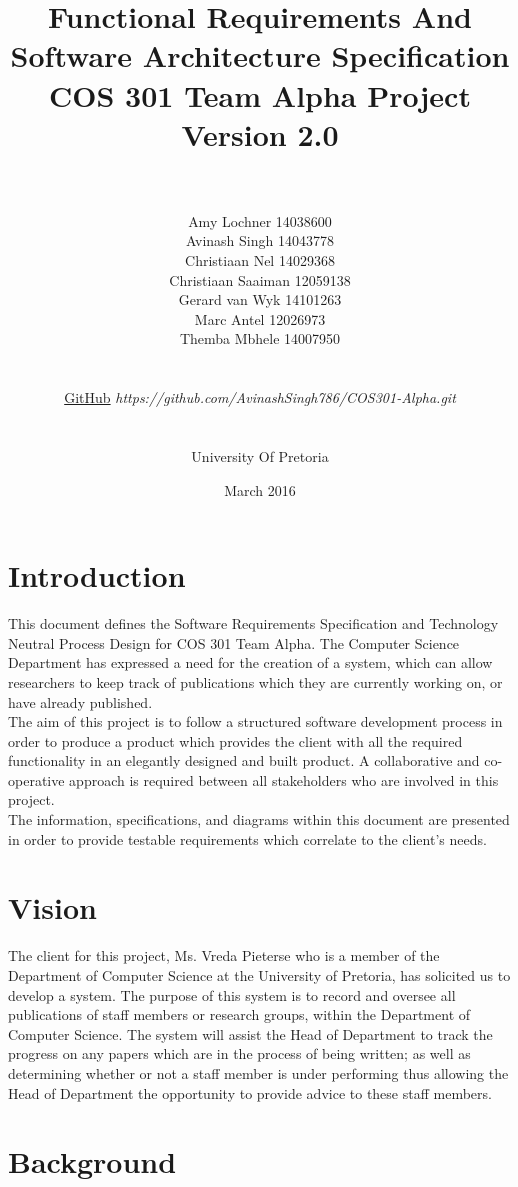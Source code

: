 \documentclass[a4paper]{article}
\title{\huge Functional Requirements And Software Architecture Specification
	\\COS 301 Team Alpha Project
	\\Version 2.0}
\author{\\\\Amy Lochner 14038600\\ Avinash Singh 14043778 \\
	Christiaan Nel 14029368\\ Christiaan Saaiman 12059138 \\
	Gerard van Wyk 14101263\\ Marc Antel 12026973\\
	Themba Mbhele 14007950
	\\
	\\
	\\\href{https://github.com/AvinashSingh786/COS301-Alpha.git}{GitHub}
	\textit{https://github.com/AvinashSingh786/COS301-Alpha.git}
	\\
	\\
	\\ University Of Pretoria\\}
\date{March 2016}
\begin{document}
	
	\maketitle
	
	\newpage
	
	\tableofcontents
	\newpage
	
	\section{Introduction}
	
	This document defines the Software Requirements Specification and Technology Neutral Process Design for COS 301 Team Alpha. The Computer Science Department has expressed a need for the creation of a system, which can allow researchers to keep track of publications which they are currently working on, or have already published.
	\\
	The aim of this project is to follow a structured software development process in order to produce a product which provides the client with all the required functionality in an elegantly designed and built product. A collaborative and co-operative approach is required between all stakeholders who are involved in this project. 
	\\
	The information, specifications, and diagrams within this document are presented in order to provide testable requirements which correlate to the client's needs.
	
	\section{Vision}
	The client for this project, Ms. Vreda Pieterse who is a member of the Department of Computer Science at the University of Pretoria, has solicited us to develop a system. The purpose of this system is to record and oversee all publications of staff members or research groups, within the Department of Computer Science. The system will assist the Head of Department to track the progress on any papers which are in the process of being written; as well as determining whether or not a staff member is under performing thus allowing the Head of Department the opportunity to provide advice to these staff members.
	
	\section{Background}
\end{document}

